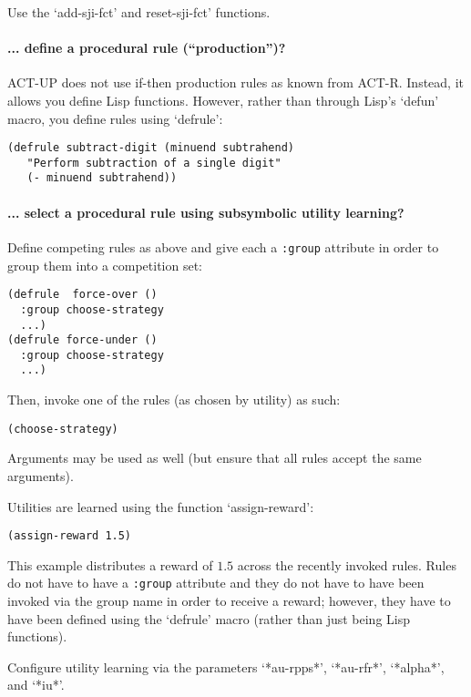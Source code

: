 \documentclass{article}
\begin{document}
Use the `add-sji-fct' and reset-sji-fct' functions.



\paragraph {... define a procedural rule (``production'')?}

ACT-UP does not use if-then production rules as known from ACT-R. 
Instead, it allows you define Lisp functions.  However, rather than through Lisp's `defun' macro, you define rules using `defrule':

\begin{verbatim}
(defrule subtract-digit (minuend subtrahend)
   "Perform subtraction of a single digit"
   (- minuend subtrahend))
\end{verbatim}

\paragraph {... select a procedural rule using subsymbolic utility learning?}

Define competing rules as above and give each a {\tt :group} attribute in order to group them into a competition set:

\begin{verbatim}
(defrule  force-over ()
  :group choose-strategy
  ...)
(defrule force-under ()
  :group choose-strategy
  ...)
\end{verbatim}

Then, invoke one of the rules (as chosen by utility) as such:

{\tt (choose-strategy)}

Arguments may be used as well (but ensure that all rules accept the same arguments).

Utilities are learned using the function `assign-reward':

{\tt (assign-reward 1.5)}

This example distributes a reward of $1.5$ across the recently invoked rules.
Rules do not have to have a {\tt :group} attribute and they do not have to have been invoked
via the group name in order to receive a reward; however, they have to have been defined
using the `defrule' macro (rather than just being Lisp functions).

Configure utility learning via the parameters `*au-rpps*', `*au-rfr*', `*alpha*', and `*iu*'.
\end{document}
